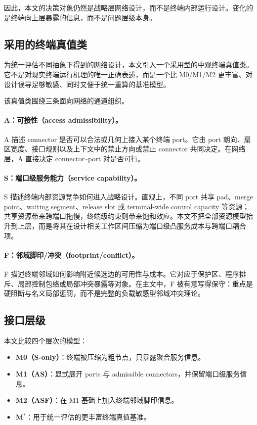 \documentclass[review,authoryear]{elsarticle}
\begin{document}
因此，本文的决策对象仍然是战略层网络设计，而不是终端内部运行设计。变化的是终端向上层暴露的信息，而不是问题层级本身。

\subsection{采用的终端真值类}
\label{sec:problem:truth}

为统一评估不同抽象下得到的网络设计，本文引入一个采用型的中观终端真值类。它不是对现实终端运行机理的唯一正确表述，而是一个比 M0/M1/M2 更丰富、对设计误导足够敏感、同时又便于统一重算的基准模型。

该真值类围绕三条面向网络的通道组织。

\paragraph{A：可接性（access admissibility）。}
A 描述 connector 是否可以合法或几何上接入某个终端 port。它由 port 朝向、扇区宽度、接口规则以及上下文中的禁止方向或禁止 connector 共同决定。在网络层，A 直接决定 connector--port 对是否可行。

\paragraph{S：端口级服务能力（service capability）。}
S 描述终端内部资源竞争如何进入战略设计。直观上，不同 port 共享 pad、merge point、waiting segment、release slot 或 terminal-wide control capacity 等资源；共享资源带来跨端口拖慢，终端级约束则带来饱和效应。本文不把全部资源模型抬升到上层，而是将其在设计相关工作区间压缩为端口级凸服务成本与跨端口耦合项。

\paragraph{F：邻域脚印/冲突（footprint/conflict）。}
F 描述终端邻域如何影响附近候选边的可用性与成本。它对应于保护区、程序排斥、局部控制包络或局部冲突暴露等对象。在主文中，F 被有意写得保守：重点是硬阻断与名义局部惩罚，而不是完整的负载敏感型邻域冲突理论。

\subsection{接口层级}
\label{sec:problem:hierarchy}

本文比较四个层次的模型：
\begin{itemize}
  \item \textbf{M0（S-only）}：终端被压缩为粗节点，只暴露聚合服务信息。
  \item \textbf{M1（AS）}：显式展开 ports 与 admissible connectors，并保留端口级服务信息。
  \item \textbf{M2（ASF）}：在 M1 基础上加入终端邻域脚印信息。
  \item \textbf{M$^*$}：用于统一评估的更丰富终端真值基准。
\end{itemize}
\end{document}
